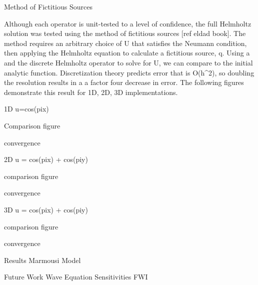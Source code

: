 Method of Fictitious Sources

Although each operator is unit-tested to a level of confidence, the full Helmholtz solution was tested using the method of fictitious sources [ref eldad book]. The method requires an arbitrary choice of U that satisfies the Neumann condition, then applying the Helmholtz equation to calculate a fictitious source, q. Using a and the discrete Helmholtz operator to solve for U, we can compare to the initial analytic function. Discretization theory predicts error that is O(h^2), so doubling the resolution results in a a factor four decrease in error. The following figures demonstrate this result for 1D, 2D, 3D implementations.
	
	1D
	u=cos(pix)
	
	Comparison figure
	
	convergence
	
	2D
	u = cos(pix) + cos(piy)
	
	comparison figure
	
	convergence
	
	3D
	u = cos(pix) + cos(piy)
	
	comparison figure
	
	convergence
	
	
	
Results
	Marmousi Model
	
	
	
Future Work
	Wave Equation
	Sensitivities 
	FWI